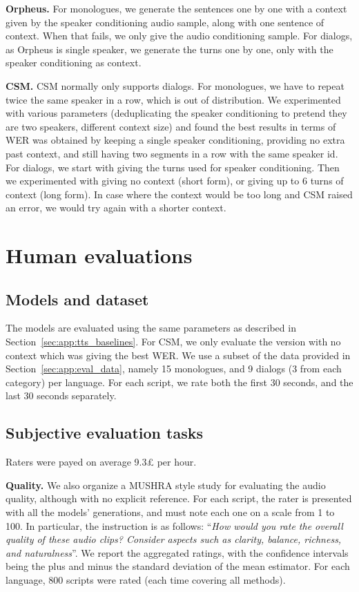 \textbf{Orpheus.} For monologues, we generate the sentences one by one
with a context given by the speaker conditioning audio sample, along with 
one sentence of context. When that fails, we only give the audio conditioning sample. For dialogs, as Orpheus is single speaker, we generate the turns one by one, only with the speaker conditioning as context.

\textbf{CSM.} CSM normally only supports dialogs. For monologues,
we have to repeat twice the same speaker in a row, which is out of distribution. We experimented with various parameters (deduplicating
the speaker conditioning to pretend they are two speakers, different context size) and found the best results in terms of WER was obtained
by keeping a single speaker conditioning, providing no extra past context, and still having two segments in a row with the same speaker id.
For dialogs, we start with giving the turns used for speaker conditioning. Then we experimented with giving no context (short form), or giving up to 6 turns of context (long form). In case where the context would be too long and CSM raised an error, we would try again with a shorter context.


\section{Human evaluations}
\label{sec:app:human_evaluations}

\subsection{Models and dataset}
The models are evaluated using the same parameters as described in Section~\ref{sec:app:tts_baselines}. For CSM, we only evaluate the version with no context which was giving the best WER.
We use a subset of the data provided in Section~\ref{sec:app:eval_data},
namely 15 monologues, and 9 dialogs (3 from each category) per language. For each script, we rate both the first 30 seconds, and the last 30 seconds separately.

\subsection{Subjective evaluation tasks}

Raters were payed on average 9.3£ per hour.


\textbf{Quality.}
We also organize a MUSHRA style study for evaluating the audio quality, although with no explicit reference. For each script, the rater is presented with all the models' generations, and must note each one on a scale from 1 to 100. In particular, the instruction is as follows:
``\emph{How would you rate the overall quality of these audio clips?
Consider aspects such as clarity, balance, richness, and naturalness}''.
We report the aggregated ratings, with the confidence intervals being the plus and minus the standard deviation of the mean estimator.
For each language, 800 scripts were rated (each time covering all methods).

